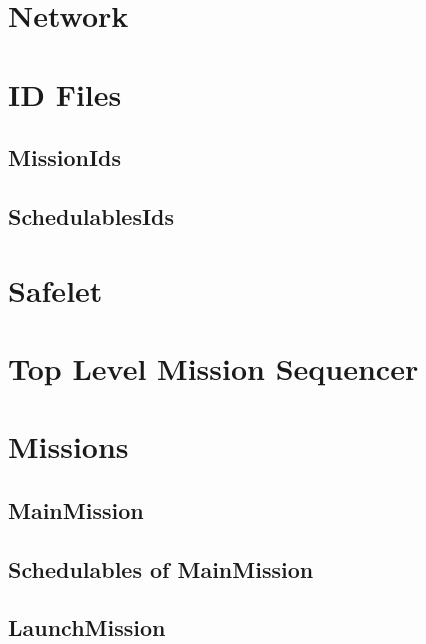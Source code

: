 \documentclass[10pt,a4paper]{article}
\begin{document}
\section{Network}

\newpage

\section{ID Files}
\subsection{MissionIds}


\subsection{SchedulablesIds}

\newpage

\section{Safelet}

\newpage

\section{Top Level Mission Sequencer}

\newpage

\section{Missions}


\subsection{MainMission}

\newpage

\subsection{Schedulables of MainMission}


\newpage


\newpage


\newpage



\subsection{LaunchMission}

\newpage
\end{document}

